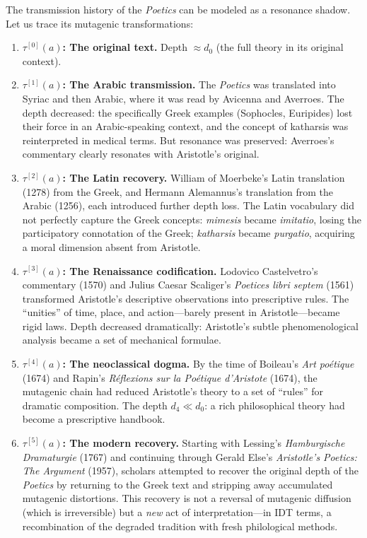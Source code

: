 \documentclass[11pt,openany]{book}
\theoremstyle{definition}
\theoremstyle{plain}
\theoremstyle{remark}
\newcommand{\transmit}{\tau}                 %
\begin{document}
The transmission history of the \emph{Poetics} can be modeled as a resonance shadow. Let us trace its mutagenic transformations:

\begin{enumerate}
\item \textbf{$\transmit^{[0]}(a)$: The original text.} Depth $\approx d_0$ (the full theory in its original context).

\item \textbf{$\transmit^{[1]}(a)$: The Arabic transmission.} The \emph{Poetics} was translated into Syriac and then Arabic, where it was read by Avicenna and Averroes. The depth decreased: the specifically Greek examples (Sophocles, Euripides) lost their force in an Arabic-speaking context, and the concept of katharsis was reinterpreted in medical terms. But resonance was preserved: Averroes's commentary clearly resonates with Aristotle's original.

\item \textbf{$\transmit^{[2]}(a)$: The Latin recovery.} William of Moerbeke's Latin translation (1278) from the Greek, and Hermann Alemannus's translation from the Arabic (1256), each introduced further depth loss. The Latin vocabulary did not perfectly capture the Greek concepts: \emph{mimesis} became \emph{imitatio}, losing the participatory connotation of the Greek; \emph{katharsis} became \emph{purgatio}, acquiring a moral dimension absent from Aristotle.

\item \textbf{$\transmit^{[3]}(a)$: The Renaissance codification.} Lodovico Castelvetro's commentary (1570) and Julius Caesar Scaliger's \emph{Poetices libri septem} (1561) transformed Aristotle's descriptive observations into prescriptive rules. The ``unities'' of time, place, and action---barely present in Aristotle---became rigid laws. Depth decreased dramatically: Aristotle's subtle phenomenological analysis became a set of mechanical formulae.

\item \textbf{$\transmit^{[4]}(a)$: The neoclassical dogma.} By the time of Boileau's \emph{Art poétique} (1674) and Rapin's \emph{Réflexions sur la Poétique d'Aristote} (1674), the mutagenic chain had reduced Aristotle's theory to a set of ``rules'' for dramatic composition. The depth $d_4 \ll d_0$: a rich philosophical theory had become a prescriptive handbook.

\item \textbf{$\transmit^{[5]}(a)$: The modern recovery.} Starting with Lessing's \emph{Hamburgische Dramaturgie} (1767) and continuing through Gerald Else's \emph{Aristotle's Poetics: The Argument} (1957), scholars attempted to recover the original depth of the \emph{Poetics} by returning to the Greek text and stripping away accumulated mutagenic distortions. This recovery is not a reversal of mutagenic diffusion (which is irreversible) but a \emph{new} act of interpretation---in IDT terms, a recombination of the degraded tradition with fresh philological methods.
\end{enumerate}
\end{document}
